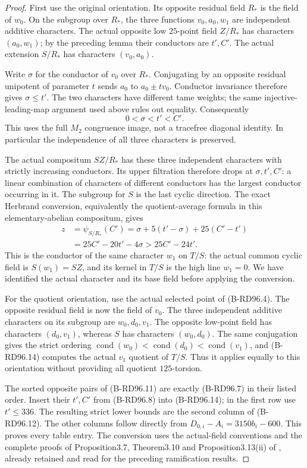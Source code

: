 \begin{proof}
First use the original orientation. Its opposite residual field
$R_*$ is the field of $w_0$. On the subgroup over $R_*$, the
three functions $v_0,a_0,w_1$ are independent additive characters.
The actual opposite low $25$-point field $Z/R_*$ has characters
$(a_0,w_1)$; by the preceding lemma their conductors are $t',C'$.
The actual extension $S/R_*$ has characters $(v_0,a_0)$.

Write $\sigma$ for the conductor of $v_0$ over $R_*$. Conjugating
by an opposite residual unipotent of parameter $t$ sends $a_0$
to $a_0\pm t v_0$. Conductor invariance therefore gives
$\sigma\le t'$. The two characters have different tame weights;
the same injective-leading-map argument used above rules out
equality. Consequently
\[
                              0<\sigma<t'<C'.          \tag{B-RD96.13}
\]
This uses the full $M_2$ congruence image, not a tracefree diagonal
identity. In particular the independence of all three characters
is preserved.

The actual compositum $SZ/R_*$ has these three independent
characters with strictly increasing conductors. Its upper
filtration therefore drops at $\sigma,t',C'$: a linear combination
of characters of different conductors has the largest conductor
occurring in it. The subgroup for $S$ is the last cyclic direction.
The exact Herbrand conversion, equivalently the quotient-average
formula in this elementary-abelian compositum, gives
\[
\begin{split}
 z&=\psi_{S/R_*}(C')
    =\sigma+5(t'-\sigma)+25(C'-t')\\
  &=25C'-20t'-4\sigma>25C'-24t'.
\end{split}                                             \tag{B-RD96.14}
\]
This is the conductor of the same character $w_1$ on $T/S$:
the actual common cyclic field is $S(w_1)=SZ$, and its kernel
in $T/S$ is the high line $w_1=0$. We have identified the actual
character and its base field before applying the conversion.

For the quotient orientation, use the actual selected point of
(B-RD96.4). The opposite residual field is now the field of $v_0$.
The three independent additive characters on its subgroup are
$w_0,d_0,v_1$. The opposite low-point field has characters
$(d_0,v_1)$, whereas $S$ has characters $(w_0,d_0)$.
The same conjugation gives the strict ordering
$\operatorname{cond}(w_0)<\operatorname{cond}(d_0)
 <\operatorname{cond}(v_1)$, and (B-RD96.14) computes the
actual $v_1$ quotient of $T/S$. Thus it applies equally to this
orientation without providing all quotient $125$-torsion.

The sorted opposite pairs of (B-RD96.11) are exactly (B-RD96.7)
in their listed order. Insert their $t',C'$ from (B-RD96.8)
into (B-RD96.14); in the first row use $t'\le336$.
The resulting strict lower bounds are the second column of
(B-RD96.12). The other columns follow directly from
$D_{0,i}-A_i=3150b_i-600$. This proves every table entry.
The conversion uses the actual-field conventions and the complete
proofs of Proposition3.7, Theorem3.10 and Proposition3.13(ii)
of \cite[pp.~14--16]{ColmezCorpsLocaux}, already retained and read
for the preceding ramification results.
\end{proof}

